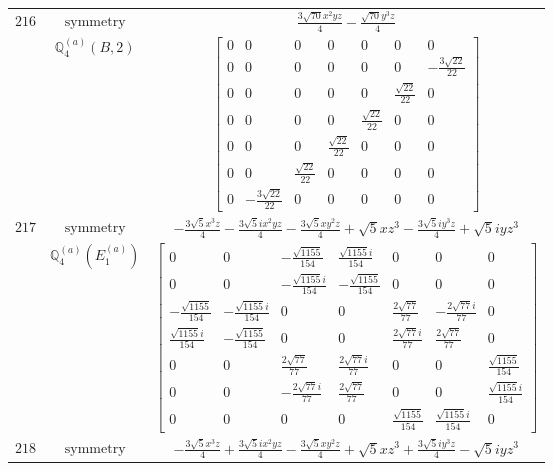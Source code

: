 \documentclass[fleqn,8pt,landscape]{jsarticle}
\begin{document}
\begin{longtable}{ccc}
$ 216 $ & $ \text{symmetry} $ & $ \frac{3 \sqrt{70} x^{2} y z}{4} - \frac{\sqrt{70} y^{3} z}{4} $ \\
$  $ & $ \mathbb{Q}_{4}^{(a)}(B,2) $ & $ \begin{bmatrix} 0 & 0 & 0 & 0 & 0 & 0 & 0 \\ 0 & 0 & 0 & 0 & 0 & 0 & - \frac{3 \sqrt{22}}{22} \\ 0 & 0 & 0 & 0 & 0 & \frac{\sqrt{22}}{22} & 0 \\ 0 & 0 & 0 & 0 & \frac{\sqrt{22}}{22} & 0 & 0 \\ 0 & 0 & 0 & \frac{\sqrt{22}}{22} & 0 & 0 & 0 \\ 0 & 0 & \frac{\sqrt{22}}{22} & 0 & 0 & 0 & 0 \\ 0 & - \frac{3 \sqrt{22}}{22} & 0 & 0 & 0 & 0 & 0 \end{bmatrix} $ \\ \hline
$ 217 $ & $ \text{symmetry} $ & $ - \frac{3 \sqrt{5} x^{3} z}{4} - \frac{3 \sqrt{5} i x^{2} y z}{4} - \frac{3 \sqrt{5} x y^{2} z}{4} + \sqrt{5} x z^{3} - \frac{3 \sqrt{5} i y^{3} z}{4} + \sqrt{5} i y z^{3} $ \\
$  $ & $ \mathbb{Q}_{4}^{(a)}(E_{1}^{(a)}) $ & $ \begin{bmatrix} 0 & 0 & - \frac{\sqrt{1155}}{154} & \frac{\sqrt{1155} i}{154} & 0 & 0 & 0 \\ 0 & 0 & - \frac{\sqrt{1155} i}{154} & - \frac{\sqrt{1155}}{154} & 0 & 0 & 0 \\ - \frac{\sqrt{1155}}{154} & - \frac{\sqrt{1155} i}{154} & 0 & 0 & \frac{2 \sqrt{77}}{77} & - \frac{2 \sqrt{77} i}{77} & 0 \\ \frac{\sqrt{1155} i}{154} & - \frac{\sqrt{1155}}{154} & 0 & 0 & \frac{2 \sqrt{77} i}{77} & \frac{2 \sqrt{77}}{77} & 0 \\ 0 & 0 & \frac{2 \sqrt{77}}{77} & \frac{2 \sqrt{77} i}{77} & 0 & 0 & \frac{\sqrt{1155}}{154} \\ 0 & 0 & - \frac{2 \sqrt{77} i}{77} & \frac{2 \sqrt{77}}{77} & 0 & 0 & \frac{\sqrt{1155} i}{154} \\ 0 & 0 & 0 & 0 & \frac{\sqrt{1155}}{154} & \frac{\sqrt{1155} i}{154} & 0 \end{bmatrix} $ \\ \hline
$ 218 $ & $ \text{symmetry} $ & $ - \frac{3 \sqrt{5} x^{3} z}{4} + \frac{3 \sqrt{5} i x^{2} y z}{4} - \frac{3 \sqrt{5} x y^{2} z}{4} + \sqrt{5} x z^{3} + \frac{3 \sqrt{5} i y^{3} z}{4} - \sqrt{5} i y z^{3} $ \\

\end{longtable}
\end{document}
